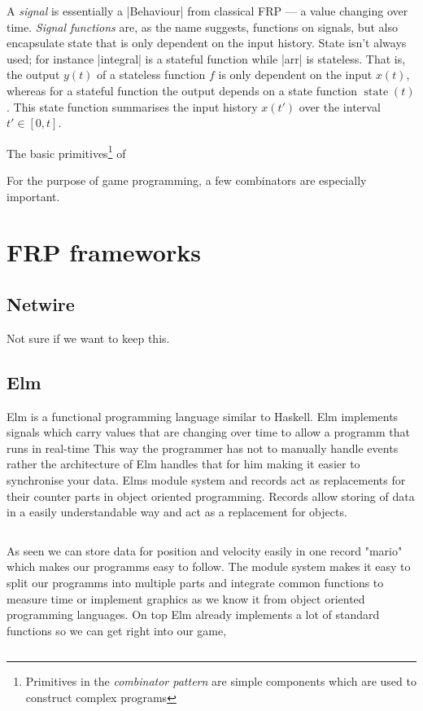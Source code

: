 \documentclass[pdftex,a4paper]{extarticle}
\begin{document}
A \emph{signal} is essentially a |Behaviour| from classical FRP --- a value changing over time.
\emph{Signal functions} are, as the name suggests, functions on signals, but also encapsulate state that is only dependent on the input history. State isn't always used; for instance |integral| is a stateful function while |arr| is stateless. That is, the output \(y(t)\) of a stateless function \(f\) is only dependent on the input \(x(t)\), whereas for a stateful function the output depends on a state function \(\operatorname{state}(t)\). This state function summarises the input history \(x(t')\) over the interval \(t' \in [0,t]\).

The basic primitives\footnote{Primitives in the \emph{combinator pattern} are simple components which are used to construct complex programs} of 

For the purpose of game programming, a few combinators are especially important.

\section{FRP frameworks}
\label{sec:frameworks}
\subsection{Netwire}
Not sure if we want to keep this.
\subsection{Elm}
Elm is a functional programming language similar to Haskell. 
Elm implements signals\cite{elm-signals} which carry values that are changing over time to allow a programm that runs in real-time
This way the programmer has not to manually handle events rather the architecture of Elm handles that for him making it easier to synchronise your data. 
Elms module system and records act as replacements for their counter parts in object oriented programming. 
Records allow storing of data in a easily understandable way and act as a replacement for objects.
\inputminted{haskell}{records.hs}
As seen we can store data for position and velocity
easily in one record "mario" which makes our programms easy to follow.
The module system makes it easy to split our programms into multiple parts and integrate common functions to measure time or implement graphics as we know it from object oriented programming languages.
On top Elm already implements a lot of standard functions so we can get right into our game,
\inputminted{haskell}{module.hs}
\cite{elm-examples}
\end{document}
